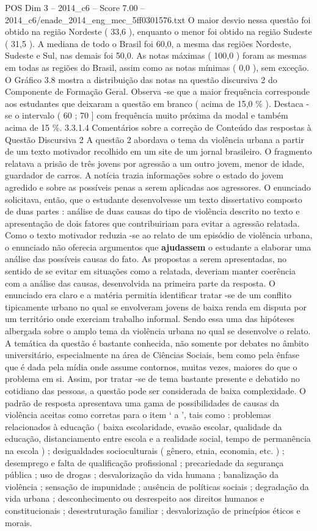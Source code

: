 \begin{textsample}{POS Dim 3 – 2014\_c6 – Score 7.00 – 2014\_c6/enade\_2014\_eng\_mec\_5ff0301576.txt}
O maior desvio nessa questão foi obtido na região Nordeste ( 33,6 ), enquanto o menor foi obtido na região Sudeste ( 31,5 ).
A mediana de todo o Brasil foi 60,0, a mesma das regiões Nordeste, Sudeste e Sul, nas demais foi 50,0.
As notas máximas ( 100,0 ) foram as mesmas em todas as regiões do Brasil, assim como as notas mínimas ( 0,0 ), sem exceção.
O Gráfico 3.8 mostra a distribuição das notas na questão discursiva 2 do Componente de Formação Geral.
Observa -se que a maior frequência corresponde aos estudantes que deixaram a questão em branco ( acima de 15,0 \% ).
Destaca -se o intervalo ( 60 ; 70 ] com frequência muito próxima da modal e também acima de 15 \%. 3.3.1.4 Comentários sobre a correção de Conteúdo das respostas à Questão Discursiva 2 A questão 2 abordava o tema da violência urbana a partir de um texto motivador recolhido em um site de um jornal brasileiro.
O fragmento relatava a prisão de três jovens por agressão a um outro jovem, menor de idade, guardador de carros.
A notícia trazia informações sobre o estado do jovem agredido e sobre as possíveis penas a serem aplicadas aos agressores.
O enunciado solicitava, então, que o estudante desenvolvesse um texto dissertativo composto de duas partes : análise de duas causas do tipo de violência descrito no texto e apresentação de dois fatores que contribuiriam para evitar a agressão relatada.
Como o texto motivador reduzia -se ao relato de um episódio de violência urbana, o enunciado não oferecia argumentos que \textbf{ajudassem} o estudante a elaborar uma análise das possíveis causas do fato.
As propostas a serem apresentadas, no sentido de se evitar em situações como a relatada, deveriam manter coerência com a análise das causas, desenvolvida na primeira parte da resposta.
O enunciado era claro e a matéria permitia identificar tratar -se de um conflito tipicamente urbano no qual se envolveram jovens de baixa renda em disputa por um território onde exerciam trabalho informal.
Sendo essa uma das hipóteses albergada sobre o amplo tema da violência urbana no qual se desenvolve o relato.
A temática da questão é bastante conhecida, não somente por debates no âmbito universitário, especialmente na área de Ciências Sociais, bem como pela ênfase que é dada pela mídia onde assume contornos, muitas vezes, maiores do que o problema em si.
Assim, por tratar -se de tema bastante presente e debatido no cotidiano das pessoas, a questão pode ser considerada de baixa complexidade.
O padrão de resposta apresentava uma gama de possibilidades de causas da violência aceitas como corretas para o item ‘ a ’, tais como : problemas relacionados à educação ( baixa escolaridade, evasão escolar, qualidade da educação, distanciamento entre escola e a realidade social, tempo de permanência na escola ) ; desigualdades socioculturais ( gênero, etnia, economia, etc. ) ; desemprego e falta de qualificação profissional ; precariedade da segurança pública ; uso de drogas ; desvalorização da vida humana ; banalização da violência ; sensação de impunidade ; ausência de políticas sociais ; degradação da vida urbana ; desconhecimento ou desrespeito aos direitos humanos e constitucionais ; desestruturação familiar ; desvalorização de princípios éticos e morais.

\end{textsample}
